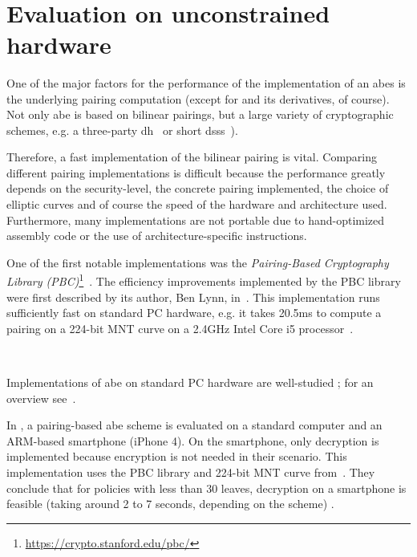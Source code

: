 ~

\section{Evaluation on unconstrained hardware}
One of the major factors for the performance of the implementation of an \acrshort{abes} is the underlying pairing computation (except for \cite{yao_lightweight_2015} and its derivatives, of course).
Not only \acrshort{abe} is based on bilinear pairings, but a large variety of cryptographic schemes, e.g. a three-party \gls{dh}~\cite{joux_one_2000} or short \glspl{dss}~\cite{boneh_short_2001}).

Therefore, a fast implementation of the bilinear pairing is vital.
Comparing different pairing implementations is difficult because the performance greatly depends on the \gls{security-level}, the concrete pairing implemented, the choice of elliptic curves and of course the speed of the hardware and architecture used. 
Furthermore, many implementations are not portable due to hand-optimized assembly code or the use of architecture-specific instructions.

One of the first notable implementations was the \emph{Pairing-Based Cryptography Library (PBC)}\footnote{\label{footnotepbc}\url{https://crypto.stanford.edu/pbc/}}~\cite{lynn_implementation_2007}. %
The efficiency improvements implemented by the PBC library were first described by its author, Ben Lynn, in~\cite{lynn_implementation_2007}.
This implementation runs sufficiently fast on standard PC hardware, e.g. it takes 20.5ms to compute a pairing on a 224-bit MNT curve on a 2.4GHz Intel Core i5 processor~\cite{akinyele_self-protecting_2010}.

~

Implementations of \acrshort{abe} on standard PC hardware are well-studied \cite{bethencourt_ciphertext-policy_2007,akinyele_charm_2013,green_functional_nodate}; for an overview see~\cite{zickau_applied_2016}.

In \cite{akinyele_self-protecting_2010}, a pairing-based \acrshort{abe} scheme is evaluated on a standard computer and an ARM-based smartphone (iPhone 4).
On the smartphone, only decryption is implemented because encryption is not needed in their scenario.
This implementation uses the PBC library and 224-bit MNT curve from~\cite{lynn_implementation_2007}.
They conclude that for policies with less than 30 leaves, decryption on a smartphone is feasible (taking around 2 to 7 seconds, depending on the scheme) \cite{akinyele_self-protecting_2010}.

